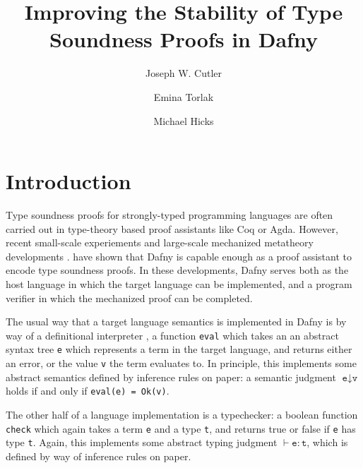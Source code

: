 \documentclass[sigplan,review,screen,anonymous]{acmart}
\author{Joseph W. Cutler}
\affiliation{%
  \institution{University of Pennsylvania}
  \city{Philadelphia}
  \state{Pennsylvania}
  \country{USA}
}
\author{Emina Torlak}
\affiliation{%
  \institution{Amazon Web Services}
  \city{Seattle}
  \state{Washington}
  \country{USA}
}
\author{Michael Hicks}
\affiliation{%
  \institution{Amazon Web Services}
  \city{Arlington}
  \state{Virginia}
  \country{USA}
}
\title{Improving the Stability of Type Soundness Proofs in Dafny}
\begin{document}
\maketitle

\section{Introduction}
Type soundness proofs for strongly-typed programming languages are often carried
out in type-theory based proof assistants like Coq or Agda. However, recent
small-scale experiements \cite{mayer-blog-post} and large-scale mechanized
metatheory developments \cite{cedar-dafny}.  have shown that Dafny is capable
enough as a proof assistant to encode type soundness proofs. In these
developments, Dafny serves both as the host language in which the target
language can be implemented, and a program verifier in which the mechanized
proof can be completed.

The usual way that a target language semantics is implemented in Dafny
is by way of a definitional interpreter \cite{definitional-interpreters}, a function \texttt{eval} which takes an
an abstract syntax tree \texttt{e} which represents a term in the target language, and returns either an error,
or the value \texttt{v} the term evaluates to. In principle, this implements some abstract semantics defined
by inference rules on paper: a semantic judgment $\texttt{e} \downarrow \texttt{v}$ holds if and only if \texttt{eval(e) = Ok(v)}.

The other half of a language implementation is a typechecker: a boolean function \texttt{check} which again takes a term \texttt{e}
and a type \texttt{t}, and returns true or false if \texttt{e} has type \texttt{t}. Again, this implements some abstract typing
judgment $\vdash \texttt{e} : \texttt{t}$, which is defined by way of inference rules on paper. 
\end{document}
